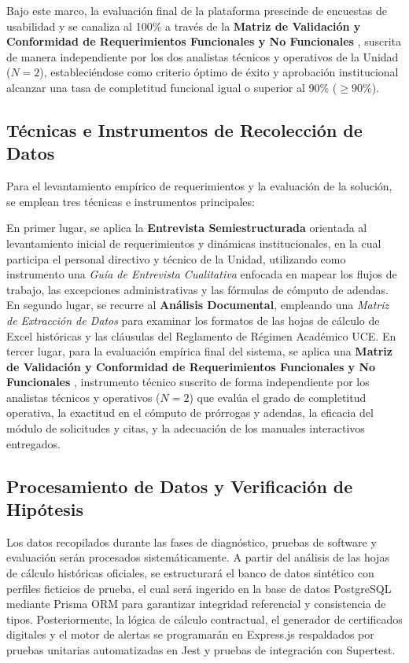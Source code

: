 Bajo este marco, la evaluación final de la plataforma prescinde de encuestas de usabilidad y se canaliza al 100\% a través de la \textbf{Matriz de Validación y Conformidad de Requerimientos Funcionales y No Funcionales} \cite{ieee_requirements}, suscrita de manera independiente por los dos analistas técnicos y operativos de la Unidad ($N = 2$), estableciéndose como criterio óptimo de éxito y aprobación institucional alcanzar una tasa de completitud funcional igual o superior al 90\% ($\ge 90\%$).

\subsection{Técnicas e Instrumentos de Recolección de Datos}

Para el levantamiento empírico de requerimientos y la evaluación de la solución, se emplean tres técnicas e instrumentos principales:

En primer lugar, se aplica la \textbf{Entrevista Semiestructurada} orientada al levantamiento inicial de requerimientos y dinámicas institucionales, en la cual participa el personal directivo y técnico de la Unidad, utilizando como instrumento una \textit{Guía de Entrevista Cualitativa} enfocada en mapear los flujos de trabajo, las excepciones administrativas y las fórmulas de cómputo de adendas. En segundo lugar, se recurre al \textbf{Análisis Documental}, empleando una \textit{Matriz de Extracción de Datos} para examinar los formatos de las hojas de cálculo de Excel históricas y las cláusulas del Reglamento de Régimen Académico UCE. En tercer lugar, para la evaluación empírica final del sistema, se aplica una \textbf{Matriz de Validación y Conformidad de Requerimientos Funcionales y No Funcionales} \cite{ieee_requirements}, instrumento técnico suscrito de forma independiente por los analistas técnicos y operativos ($N = 2$) que evalúa el grado de completitud operativa, la exactitud en el cómputo de prórrogas y adendas, la eficacia del módulo de solicitudes y citas, y la adecuación de los manuales interactivos entregados.

\subsection{Procesamiento de Datos y Verificación de Hipótesis}

Los datos recopilados durante las fases de diagnóstico, pruebas de software y evaluación serán procesados sistemáticamente. A partir del análisis de las hojas de cálculo históricas oficiales, se estructurará el banco de datos sintético con perfiles ficticios de prueba, el cual será ingerido en la base de datos PostgreSQL mediante Prisma ORM para garantizar integridad referencial y consistencia de tipos. Posteriormente, la lógica de cálculo contractual, el generador de certificados digitales y el motor de alertas se programarán en Express.js respaldados por pruebas unitarias automatizadas en Jest y pruebas de integración con Supertest.

